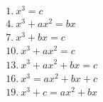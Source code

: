 \documentclass[preview]{standalone}
\begin{document}
\begin{align*}
&1.\ x^3=c   \\ &4.\ x^3+ax^2=bx \\ &7.\ x^3+bx=c \\ &10.\ x^3+ax^2=c \\ &13.\ x^3+ax^2+bx=c \\ &16.\ x^3=ax^2+bx+c \\ &19.\ x^3+c=ax^2+bx
\end{align*}
\end{document}
